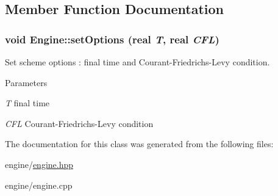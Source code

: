 \subsection{Member Function Documentation}
\hypertarget{classEngine_a6837cf148e122390a924718435cea117}{
\subsubsection[{setOptions}]{\setlength{\rightskip}{0pt plus 5cm}void Engine::setOptions (real {\em T}, \/  real {\em CFL})}}
\label{classEngine_a6837cf148e122390a924718435cea117}


Set scheme options : final time and Courant-\/Friedrichs-\/Levy condition. 
\begin{DoxyParams}{Parameters}
\item[{\em T}]final time \item[{\em CFL}]Courant-\/Friedrichs-\/Levy condition \end{DoxyParams}


The documentation for this class was generated from the following files:\begin{DoxyCompactItemize}
\item 
engine/\hyperlink{engine_8hpp}{engine.hpp}\item 
engine/engine.cpp\end{DoxyCompactItemize}
